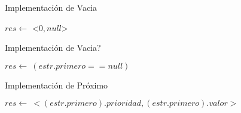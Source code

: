\begin{Algoritmos}

\begin{algorithm}
\caption{Implementaci\'on de Vacia}
\begin{algorithmic}[0]
\State $res\gets $ <$0, null$> 
\EndFunction
\end{algorithmic}
\end{algorithm}


\begin{algorithm}
\caption{Implementaci\'on de Vacia?}
\begin{algorithmic}[0]
\State $res\gets \ (estr.primero == null)$ 
\EndFunction
\end{algorithmic}
\end{algorithm}

\begin{algorithm}
\caption{Implementaci\'on de Pr\'oximo}
\begin{algorithmic}[0]
\State $res\gets \ <(estr.primero).prioridad, (estr.primero).valor>$ 
\EndFunction
\end{algorithmic}
\end{algorithm}




\end{Algoritmos}
